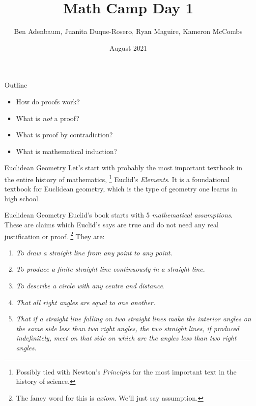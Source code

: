 \documentclass{beamer}
\title{Math Camp Day 1}
\author{Ben Adenbaum, Juanita Duque-Rosero, Ryan Maguire, Kameron McCombs}
\date{August 2021}
\begin{document}
    \maketitle
    \begin{frame}{Outline}
        \begin{itemize}
            \item How do proofs work?
            \item What is \textit{not} a proof?
            \item What is proof by contradiction?
            \item What is mathematical induction?
        \end{itemize}
    \end{frame}
    \begin{frame}{Euclidean Geometry}
        Let's start with probably the most important
        textbook in the entire history of mathematics,%
        \footnote{%
            Possibly tied with Newton's \textit{Principia} for the most
            important text in the history of science.%
        }
        Euclid's \textit{Elements}. It is a foundational textbook for
        Euclidean geometry, which is the type of geometry one
        learns in high school.
    \end{frame}
    \begin{frame}{Euclidean Geometry}
        Euclid's book starts with 5 \textit{mathematical assumptions}. These are claims which Euclid's
        says are true and do not need any real justification or proof.%
        \footnote{The fancy word for this is \textit{axiom}. We'll just say assumption.}
        They are:
        \begin{enumerate}
            \item
                \textit{To draw a straight line from any point}
                \textit{to any point.}
            \item
                \textit{To produce a finite straight line continuously in}
                \textit{a straight line.}
            \item
                \textit{To describe a circle with any centre and}
                \textit{distance.}
            \item
                \textit{That all right angles are equal to one another.}
            \item
                \textit{That if a straight line falling on two straight}
                \textit{lines make the interior angles on the same side}
                \textit{less than two right angles, the two straight}
                \textit{lines, if produced indefinitely, meet on that}
                \textit{side on which are the angles less than two right}
                \textit{angles.}
        \end{enumerate}
    \end{frame}
\end{document}
